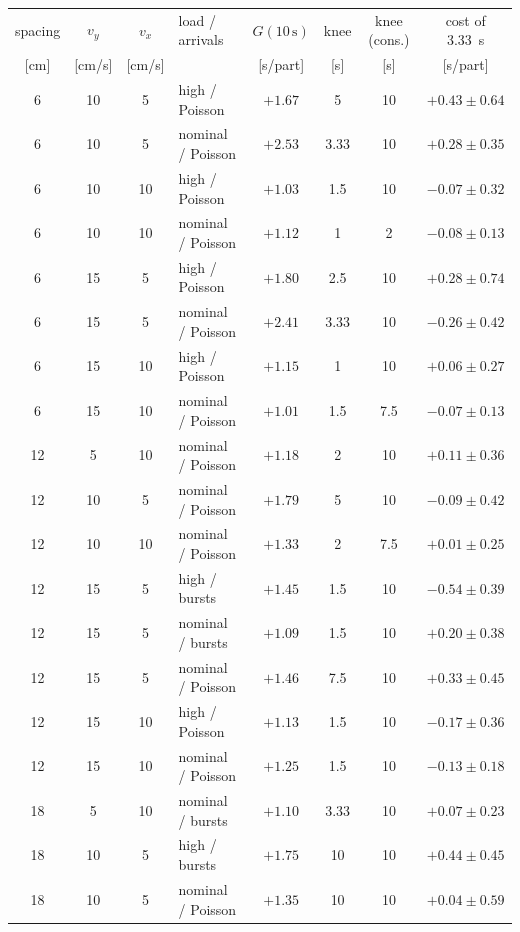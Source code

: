 \begin{tabular}{@{}cccl cccc@{}}
\toprule
spacing & $v_y$ & $v_x$ & load / arrivals & $G(10\,\mathrm{s})$ & knee & knee (cons.) & cost of 3.33~s \\
{[cm]} & [cm/s] & [cm/s] & & [s/part] & [s] & [s] & [s/part] \\
\midrule
6 & 10 & 5 & high / Poisson & $+1.67$ & 5 & 10 & $+0.43 \pm 0.64$ \\
6 & 10 & 5 & nominal / Poisson & $+2.53$ & 3.33 & 10 & $+0.28 \pm 0.35$ \\
6 & 10 & 10 & high / Poisson & $+1.03$ & 1.5 & 10 & $-0.07 \pm 0.32$ \\
6 & 10 & 10 & nominal / Poisson & $+1.12$ & 1 & 2 & $-0.08 \pm 0.13$ \\
6 & 15 & 5 & high / Poisson & $+1.80$ & 2.5 & 10 & $+0.28 \pm 0.74$ \\
6 & 15 & 5 & nominal / Poisson & $+2.41$ & 3.33 & 10 & $-0.26 \pm 0.42$ \\
6 & 15 & 10 & high / Poisson & $+1.15$ & 1 & 10 & $+0.06 \pm 0.27$ \\
6 & 15 & 10 & nominal / Poisson & $+1.01$ & 1.5 & 7.5 & $-0.07 \pm 0.13$ \\
12 & 5 & 10 & nominal / Poisson & $+1.18$ & 2 & 10 & $+0.11 \pm 0.36$ \\
12 & 10 & 5 & nominal / Poisson & $+1.79$ & 5 & 10 & $-0.09 \pm 0.42$ \\
12 & 10 & 10 & nominal / Poisson & $+1.33$ & 2 & 7.5 & $+0.01 \pm 0.25$ \\
12 & 15 & 5 & high / bursts & $+1.45$ & 1.5 & 10 & {\boldmath$-0.54 \pm 0.39$} \\
12 & 15 & 5 & nominal / bursts & $+1.09$ & 1.5 & 10 & $+0.20 \pm 0.38$ \\
12 & 15 & 5 & nominal / Poisson & $+1.46$ & 7.5 & 10 & $+0.33 \pm 0.45$ \\
12 & 15 & 10 & high / Poisson & $+1.13$ & 1.5 & 10 & $-0.17 \pm 0.36$ \\
12 & 15 & 10 & nominal / Poisson & $+1.25$ & 1.5 & 10 & $-0.13 \pm 0.18$ \\
18 & 5 & 10 & nominal / bursts & $+1.10$ & 3.33 & 10 & $+0.07 \pm 0.23$ \\
18 & 10 & 5 & high / bursts & $+1.75$ & 10 & 10 & $+0.44 \pm 0.45$ \\
18 & 10 & 5 & nominal / Poisson & $+1.35$ & 10 & 10 & $+0.04 \pm 0.59$ \\
\bottomrule
\end{tabular}
